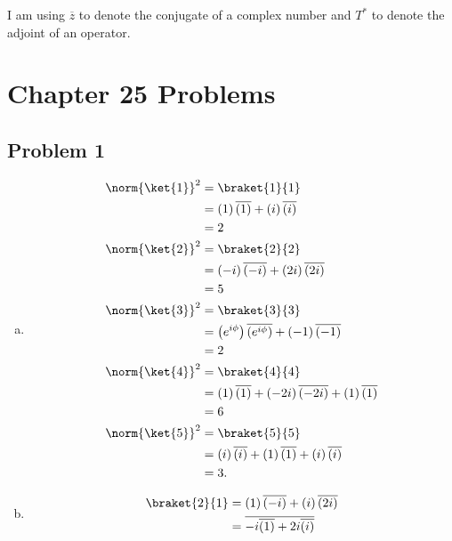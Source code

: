 \documentclass[10pt]{mypackage}
\begin{document}
\RaggedRight
I am using $\overline{z}$ to denote the conjugate of a complex number and $T^{\ast}$ to denote the adjoint of an operator.
\section{Chapter 25 Problems}%
\subsection{Problem 1}%
\begin{enumerate}[(a)]
  \item 
    \begin{align*}
      \norm{\ket{1}}^2 &= \braket{1}{1}\\
                       &= \left(1\right)\overline{\left(1\right)} + \left(i\right)\overline{\left(i\right)}\\
                  &= 2\\
      \norm{\ket{2}}^2 &= \braket{2}{2}\\
                       &= \left(-i\right)\overline{\left(-i\right)} + \left(2i\right)\overline{\left(2i\right)}\\
                  &= 5\\
      \norm{\ket{3}}^2 &= \braket{3}{3}\\
                       &= \left(e^{i\phi}\right)\overline{\left(e^{i\phi}\right)} + \left(-1\right)\overline{\left(-1\right)}\\
                       &= 2\\
      \norm{\ket{4}}^2 &= \braket{4}{4}\\
                       &= \left(1\right)\overline{\left(1\right)} + \left(-2i\right)\overline{\left(-2i\right)} + \left(1\right)\overline{\left(1\right)}\\
                       &= 6\\
      \norm{\ket{5}}^2 &= \braket{5}{5}\\
                       &= \left(i\right)\overline{\left(i\right)} + \left(1\right)\overline{\left(1\right)} + \left(i\right)\overline{\left(i\right)}\\
                       &= 3.
    \end{align*}
  \item
    \begin{align*}
      \braket{2}{1} &= \left(1\right)\overline{\left(-i\right)} + \left(i\right)\overline{\left(2i\right)}\\
                    &= \overline{-i\overline{\left(1\right)} + 2i\overline{\left(i\right)}}\\

\end{align*}
\end{enumerate}
\end{document}
